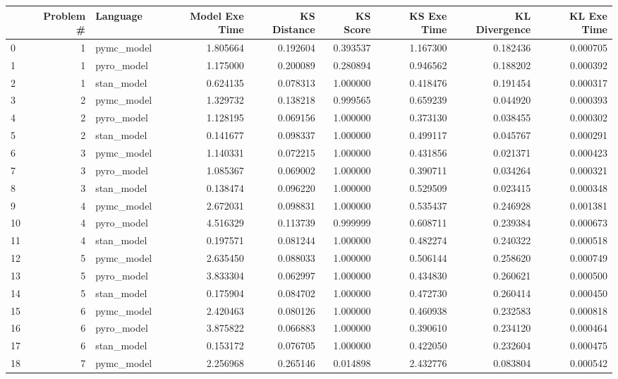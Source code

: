 \begin{tabular}{lrlrrrrrr}
\toprule
 & Problem # & Language & Model Exe Time & KS Distance & KS Score & KS Exe Time & KL Divergence & KL Exe Time \\
\midrule
0 & 1 & pymc_model & 1.805664 & 0.192604 & 0.393537 & 1.167300 & 0.182436 & 0.000705 \\
1 & 1 & pyro_model & 1.175000 & 0.200089 & 0.280894 & 0.946562 & 0.188202 & 0.000392 \\
2 & 1 & stan_model & 0.624135 & 0.078313 & 1.000000 & 0.418476 & 0.191454 & 0.000317 \\
3 & 2 & pymc_model & 1.329732 & 0.138218 & 0.999565 & 0.659239 & 0.044920 & 0.000393 \\
4 & 2 & pyro_model & 1.128195 & 0.069156 & 1.000000 & 0.373130 & 0.038455 & 0.000302 \\
5 & 2 & stan_model & 0.141677 & 0.098337 & 1.000000 & 0.499117 & 0.045767 & 0.000291 \\
6 & 3 & pymc_model & 1.140331 & 0.072215 & 1.000000 & 0.431856 & 0.021371 & 0.000423 \\
7 & 3 & pyro_model & 1.085367 & 0.069002 & 1.000000 & 0.390711 & 0.034264 & 0.000321 \\
8 & 3 & stan_model & 0.138474 & 0.096220 & 1.000000 & 0.529509 & 0.023415 & 0.000348 \\
9 & 4 & pymc_model & 2.672031 & 0.098831 & 1.000000 & 0.535437 & 0.246928 & 0.001381 \\
10 & 4 & pyro_model & 4.516329 & 0.113739 & 0.999999 & 0.608711 & 0.239384 & 0.000673 \\
11 & 4 & stan_model & 0.197571 & 0.081244 & 1.000000 & 0.482274 & 0.240322 & 0.000518 \\
12 & 5 & pymc_model & 2.635450 & 0.088033 & 1.000000 & 0.506144 & 0.258620 & 0.000749 \\
13 & 5 & pyro_model & 3.833304 & 0.062997 & 1.000000 & 0.434830 & 0.260621 & 0.000500 \\
14 & 5 & stan_model & 0.175904 & 0.084702 & 1.000000 & 0.472730 & 0.260414 & 0.000450 \\
15 & 6 & pymc_model & 2.420463 & 0.080126 & 1.000000 & 0.460938 & 0.232583 & 0.000818 \\
16 & 6 & pyro_model & 3.875822 & 0.066883 & 1.000000 & 0.390610 & 0.234120 & 0.000464 \\
17 & 6 & stan_model & 0.153172 & 0.076705 & 1.000000 & 0.422050 & 0.232604 & 0.000475 \\
18 & 7 & pymc_model & 2.256968 & 0.265146 & 0.014898 & 2.432776 & 0.083804 & 0.000542 \\

\end{tabular}
